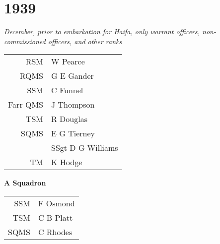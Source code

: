 \chapter*{1939}

\begin{center}
  \textit{December, prior to embarkation for Haifa, only warrant officers, non-commissioned officers, and other ranks}
\end{center}

\begin{center}
  \begin{tabular}{rl}
    RSM & W Pearce \\
    RQMS & G E Gander \\
    SSM & C Funnel \\
    Farr QMS & J Thompson \\
    TSM & R Douglas \\
    SQMS & E G Tierney \\
    & SSgt D G Williams \\
    TM & K Hodge \\
  \end{tabular}
\end{center}

\begin{center}
  \Large
  \textbf{A Squadron}
\end{center}

\begin{center}
  \begin{tabular}{rl}
    SSM & F Osmond \\
    TSM & C B Platt \\
    SQMS & C Rhodes \\
  \end{tabular}
\end{center}

